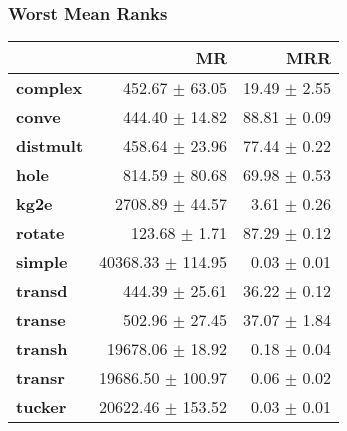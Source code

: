 \documentclass{article}
\begin{document}
    \subsubsection{Worst Mean Ranks}
    \begin{center}
    \begin{tabular}{lrr}
\toprule
{} &                 MR &           MRR \\
\midrule
\textbf{complex } &     452.67 $\pm$ 63.05 &  19.49 $\pm$ 2.55 \\
\textbf{conve   } &     444.40 $\pm$ 14.82 &  88.81 $\pm$ 0.09 \\
\textbf{distmult} &     458.64 $\pm$ 23.96 &  77.44 $\pm$ 0.22 \\
\textbf{hole    } &     814.59 $\pm$ 80.68 &  69.98 $\pm$ 0.53 \\
\textbf{kg2e    } &    2708.89 $\pm$ 44.57 &   3.61 $\pm$ 0.26 \\
\textbf{rotate  } &      123.68 $\pm$ 1.71 &  87.29 $\pm$ 0.12 \\
\textbf{simple  } &  40368.33 $\pm$ 114.95 &   0.03 $\pm$ 0.01 \\
\textbf{transd  } &     444.39 $\pm$ 25.61 &  36.22 $\pm$ 0.12 \\
\textbf{transe  } &     502.96 $\pm$ 27.45 &  37.07 $\pm$ 1.84 \\
\textbf{transh  } &   19678.06 $\pm$ 18.92 &   0.18 $\pm$ 0.04 \\
\textbf{transr  } &  19686.50 $\pm$ 100.97 &   0.06 $\pm$ 0.02 \\
\textbf{tucker  } &  20622.46 $\pm$ 153.52 &   0.03 $\pm$ 0.01 \\
\bottomrule
\end{tabular}

    \end{center}
\end{document}
